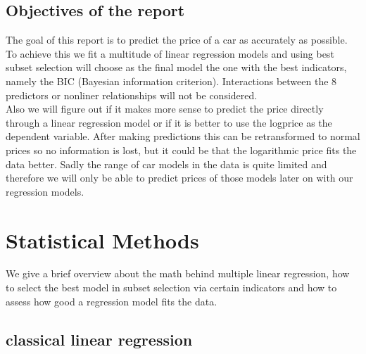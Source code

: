 \documentclass[12 pt]{scrartcl}
\begin{document}
\subsection{Objectives of the report}
The goal of this report is to predict the price of a car as accurately as possible. To achieve this we fit a multitude of linear regression models and using best subset selection will choose as the final model the one with the best indicators, namely the BIC (Bayesian information criterion). Interactions between the 8 predictors or nonliner relationships will not be considered. \\
Also we will figure out if it makes more sense to predict the price directly through a linear regression model or if it is better to use the logprice as the dependent variable. After making predictions this can be retransformed to normal prices so no information is lost, but it could be that the logarithmic price fits the data better.
Sadly the range of car models in the data is quite limited and therefore we will only be able to predict prices of those models later on with our regression models.

\section{Statistical Methods}

We give a brief overview about the math behind multiple linear regression, how to select the best model in subset selection via certain indicators and how to assess how good a regression model fits the data.

\subsection{classical linear regression}
\end{document}
